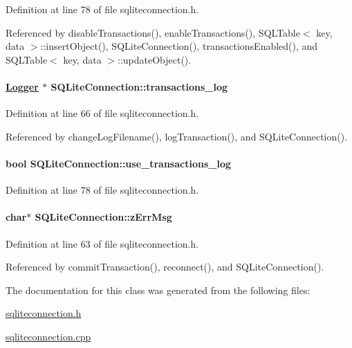 Definition at line 78 of file sqliteconnection.h.

Referenced by disable\-Transactions(), enable\-Transactions(), SQLTable$<$ key, data $>$::insert\-Object(), SQLite\-Connection(), transactions\-Enabled(), and SQLTable$<$ key, data $>$::update\-Object().\hypertarget{classSQLiteConnection_SQLiteConnectiono3}{
\paragraph[transactions\_\-log]{\setlength{\rightskip}{0pt plus 5cm}\hyperlink{classLogger}{Logger} $\ast$ SQLite\-Connection::transactions\_\-log}\hfill}
\label{classSQLiteConnection_SQLiteConnectiono3}




Definition at line 66 of file sqliteconnection.h.

Referenced by change\-Log\-Filename(), log\-Transaction(), and SQLite\-Connection().\hypertarget{classSQLiteConnection_SQLiteConnectiono9}{
\paragraph[use\_\-transactions\_\-log]{\setlength{\rightskip}{0pt plus 5cm}bool SQLite\-Connection::use\_\-transactions\_\-log}\hfill}
\label{classSQLiteConnection_SQLiteConnectiono9}




Definition at line 78 of file sqliteconnection.h.\hypertarget{classSQLiteConnection_SQLiteConnectiono1}{
\paragraph[zErrMsg]{\setlength{\rightskip}{0pt plus 5cm}char$\ast$ SQLite\-Connection::z\-Err\-Msg}\hfill}
\label{classSQLiteConnection_SQLiteConnectiono1}




Definition at line 63 of file sqliteconnection.h.

Referenced by commit\-Transaction(), reconnect(), and SQLite\-Connection().

The documentation for this class was generated from the following files:\begin{CompactItemize}
\item 
\hyperlink{sqliteconnection_8h}{sqliteconnection.h}\item 
\hyperlink{sqliteconnection_8cpp}{sqliteconnection.cpp}\end{CompactItemize}
